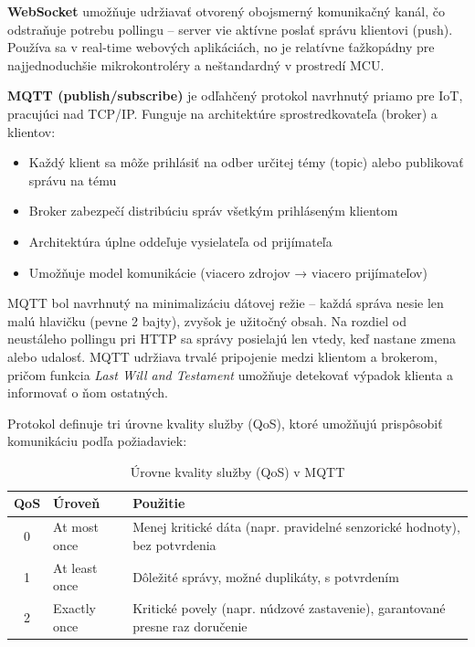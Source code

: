 \textbf{WebSocket} umožňuje udržiavať otvorený obojsmerný komunikačný kanál, čo odstraňuje potrebu pollingu -- server vie aktívne poslať správu klientovi (push). Používa sa v real-time webových aplikáciách, no je relatívne ťažkopádny pre najjednoduchšie mikrokontroléry a neštandardný v prostredí MCU.

\textbf{MQTT (publish/subscribe)} je odľahčený protokol navrhnutý priamo pre IoT, pracujúci nad TCP/IP. Funguje na architektúre sprostredkovateľa (broker) a klientov:

\begin{itemize}
    \item Každý klient sa môže prihlásiť na odber určitej témy (topic) alebo publikovať správu na tému
    \item Broker zabezpečí distribúciu správ všetkým prihláseným klientom
    \item Architektúra úplne oddeľuje vysielateľa od prijímateľa
    \item Umožňuje model komunikácie (viacero zdrojov → viacero prijímateľov)
\end{itemize}

MQTT bol navrhnutý na minimalizáciu dátovej režie -- každá správa nesie len malú hlavičku (pevne 2 bajty), zvyšok je užitočný obsah. Na rozdiel od neustáleho pollingu pri HTTP sa správy posielajú len vtedy, keď nastane zmena alebo udalosť. MQTT udržiava trvalé pripojenie medzi klientom a brokerom, pričom funkcia \textit{Last Will and Testament} umožňuje detekovať výpadok klienta a informovať o ňom ostatných.

Protokol definuje tri úrovne kvality služby (QoS), ktoré umožňujú prispôsobiť komunikáciu podľa požiadaviek:


\begin{table}[h]
\centering
\caption{Úrovne kvality služby (QoS) v MQTT}
\label{tab:mqtt-qos}
\begin{tabular}{|c|l|p{7cm}|}
\hline
\textbf{QoS} & \textbf{Úroveň} & \textbf{Použitie} \\
\hline
0 & At most once & Menej kritické dáta (napr. pravidelné senzorické hodnoty), bez potvrdenia \\
\hline
1 & At least once & Dôležité správy, možné duplikáty, s potvrdením \\
\hline
2 & Exactly once & Kritické povely (napr. núdzové zastavenie), garantované presne raz doručenie \\
\hline
\end{tabular}
\end{table}

